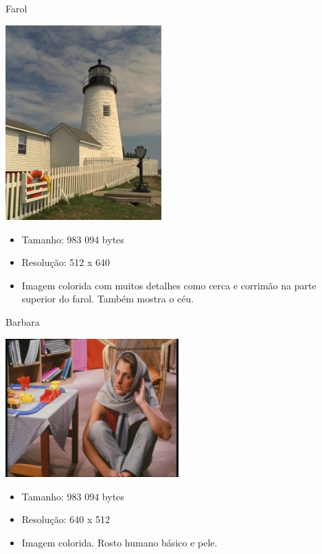 \documentclass{beamer}
\begin{document}
\begin{frame}{Farol}
   \begin{multicols}{2}
      \includegraphics[width=0.45\textwidth]{figure/lighthouse100.jpg}
      \begin{itemize}
         \item Tamanho: 983 094 bytes
         \item Resolução: 512 x 640
         \item Imagem colorida com muitos detalhes como cerca e corrimão na parte superior do farol. Também mostra o céu.
      \end{itemize}
   \end{multicols}
\end{frame}
\begin{frame}{Barbara}
   \begin{multicols}{2}
      \includegraphics[width=0.5\textwidth]{figure/barbara100.jpg}
      \begin{itemize}
         \item Tamanho: 983 094 bytes
         \item Resolução: 640 x 512
         \item Imagem colorida. Rosto humano básico e pele.
      \end{itemize}
   \end{multicols}
\end{frame}
\end{document}
